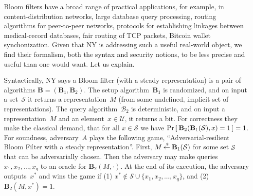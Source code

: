 Bloom filters have a broad range of practical applications, for example, in content-distribution networks, large database query processing, routing algorithms for peer-to-peer networks, protocols for establishing linkages between medical-record databases, fair routing of TCP packets, Bitcoin wallet synchonization.  Given that NY is addressing such a useful real-world object, we find their formalism, both the syntax and security notions, to be less precise and useful than one would want.  Let us explain.

Syntactically, NY says a Bloom filter (with a steady representation) is a pair of algorithms $\mathbf{B}=(\mathbf{B}_1, \mathbf{B}_2)$. The setup algorithm~$\mathbf{B}_1$ is randomized, and on input a set~$\mathcal{S}$ it returns a representation~$M$ (from some undefined, implicit set of representations).  The query algorithm~$\mathcal{B}_2$ is deterministic, and on input a representation~$M$ and an element~$x \in \mathcal{U}$, it returns a bit.  For correctness they make the classical demand, that for all $x \in \mathcal{S}$ we have $\Pr\left[\: \mathbf{B}_2(\mathbf{B}_1(\mathcal{S}),x)=1 \:\right]=1$.  For soundness, adversary~$A$ plays the following game, ``Adversarial-resilient Bloom Filter with a steady representation''. First, $M {\:\stackrel{{\scriptscriptstyle \hspace{0.2em}\$}} {\leftarrow}\:} \mathbf{B}_1(\mathcal{S})$ for some set $\mathcal{S}$ that can be adversarially chosen. Then the adversary may make queries $x_1,x_2,\ldots,x_q$ to an oracle for $\mathbf{B}_2(M,\cdot)$.  At the end of its execution, the adversary outputs~$x^*$ and wins the game if (1) $x^* \not\in \mathcal{S} \cup \{x_1,x_2,\ldots,x_q\}$, and (2) $\mathbf{B}_2(M,x^*)=1$.


